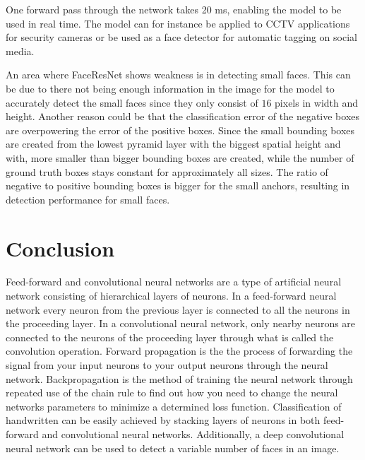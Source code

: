 \documentclass[a4paper,11pt,twoside]{article}
\begin{document}
One forward pass through the network takes 20 ms, enabling the model to be used in real time. The model can for instance be applied to CCTV applications for security cameras or be used as a face detector for automatic tagging on social media.

An area where FaceResNet shows weakness is in detecting small faces. This can be due to there not being enough information in the image for the model to accurately detect the small faces since they only consist of $16$ pixels in width and height. Another reason could be that the classification error of the negative boxes are overpowering the error of the positive boxes. Since the small bounding boxes are created from the lowest pyramid layer with the biggest spatial height and with, more smaller than bigger bounding boxes are created, while the number of ground truth boxes stays constant for approximately all sizes. The ratio of negative to positive bounding boxes is bigger for the small anchors, resulting in detection performance for small faces.
\section{Conclusion} 
Feed-forward and convolutional neural networks are a type of artificial neural network consisting of hierarchical layers of neurons. In a feed-forward neural network every neuron from the previous layer is connected to all the neurons in the proceeding layer. In a convolutional neural network, only nearby neurons are connected to the neurons of the proceeding layer through what is called the convolution operation. Forward propagation is the the process of forwarding the signal from your input neurons to your output neurons through the neural network. Backpropagation is the method of training the neural network through repeated use of the chain rule to find out how you need to change the neural networks parameters to minimize a determined loss function. Classification of handwritten can be easily achieved by stacking layers of neurons in both feed-forward and convolutional neural networks. Additionally, a deep convolutional neural network can be used to detect a variable number of faces in an image.
\end{document}
